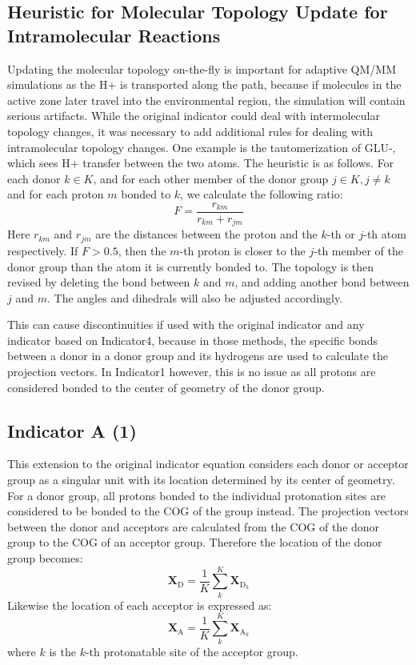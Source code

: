 \documentclass{article}
\newcommand{\mb}[1]{\mathbf{#1}}
\newcommand{\mr}[1]{\mathrm{#1}}
\begin{document}
\subsection{Heuristic for Molecular Topology Update for Intramolecular Reactions}\label{ss:topo_change}
Updating the molecular topology on-the-fly is important for adaptive QM/MM simulations as the H+ is transported along the path, because if molecules in the active zone later travel into the environmental region, the simulation will contain serious artifacts.
While the original indicator could deal with intermolecular topology changes, it was necessary to add additional rules for dealing with intramolecular topology changes.
One example is the tautomerization of GLU-, which sees H+ transfer between the two atoms.
The heuristic is as follows.
For each donor $k \in K$, and for each other member of the donor group $j \in K, j \ne k$ and for each proton $m$ bonded to $k$, we calculate the following ratio:
\begin{equation}\label{eq:ratio}
F = \frac{r_{km}}{r_{km} + r_{jm}}
\end{equation}
Here $r_{km}$ and $r_{jm}$ are the distances between the proton and the $k$-th or $j$-th atom respectively.
If $F > 0.5$, then the $m$-th proton is closer to the $j$-th member of the donor group than the atom it is currently bonded to.
The topology is then revised by deleting the bond between $k$ and $m$, and adding another bond between $j$ and $m$.
The angles and dihedrals will also be adjusted accordingly.

This can cause discontinuities if used with the original indicator and any indicator based on Indicator4, because in those methods, the specific bonds between a donor in a donor group and its hydrogens are used to calculate the projection vectors.
In Indicator1 however, this is no issue as all protons are considered bonded to the center of geometry of the donor group.

\subsection{Indicator A (1)}\label{ss:ind_a}
This extension to the original indicator equation considers each donor or acceptor group as a singular unit with its location determined by its center of geometry.
For a donor group, all protons bonded to the individual protonation sites are considered to be bonded to the COG of the group instead.
The projection vectors between the donor and acceptors are calculated from the COG of the donor group to the COG of an acceptor group.
Therefore the location of the donor group becomes:
\begin{equation}\label{eq:donor_cog}
\mb{X}_{\mr{D}} = \frac{1}{K}\sum_k^K \mb{X}_{\mr{D}_k}
\end{equation}
Likewise the location of each acceptor is expressed as:
\begin{equation}
\mb{X}_{\mr{A}} = \frac{1}{K}\sum_k^K \mb{X}_{\mr{A}_k}
\end{equation}
where $k$ is the $k$-th protonatable site of the acceptor group.
\end{document}
